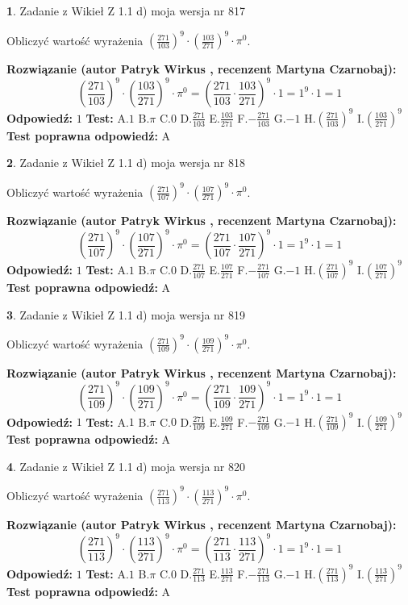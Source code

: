 \documentclass[12pt, a4paper]{article}
\theoremstyle{definition} %
\newtheorem{zad}{}
\newcommand{\zadStart}[1]{\begin{zad}#1\newline}
\newcommand{\zadStop}{\end{zad}}
\newcommand{\rozwStart}[2]{\noindent \textbf{Rozwiązanie (autor #1 , recenzent #2): }\newline}
\newcommand{\rozwStop}{\newline}
\newcommand{\odpStart}{\noindent \textbf{Odpowiedź:}\newline}
\newcommand{\odpStop}{\newline}
\newcommand{\testStart}{\noindent \textbf{Test:}\newline}
\newcommand{\testStop}{\newline}
\newcommand{\kluczStart}{\noindent \textbf{Test poprawna odpowiedź:}\newline}
\newcommand{\kluczStop}{\newline}
\begin{document}
\zadStart{Zadanie z Wikieł Z 1.1 d) moja wersja nr 817}

Obliczyć wartość wyrażenia $(\frac{271}{103})^{9} \cdot (\frac{103}{271})^{9} \cdot \pi^{0}$.
\zadStop
\rozwStart{Patryk Wirkus}{Martyna Czarnobaj}
$$(\frac{271}{103})^{9} \cdot (\frac{103}{271})^{9} \cdot \pi^{0} = (\frac{271}{103} \cdot \frac{103}{271})^{9} \cdot 1 = 1^{9} \cdot 1 = 1$$
\rozwStop
\odpStart
$1$
\odpStop
\testStart
A.$1$ B.$\pi$ C.$0$ D.$\frac{271}{103}$ E.$\frac{103}{271}$
F.$-\frac{271}{103}$ G.$-1$
H.$(\frac{271}{103})^{9}$
I.$(\frac{103}{271})^{9}$
\testStop
\kluczStart
A
\kluczStop



\zadStart{Zadanie z Wikieł Z 1.1 d) moja wersja nr 818}

Obliczyć wartość wyrażenia $(\frac{271}{107})^{9} \cdot (\frac{107}{271})^{9} \cdot \pi^{0}$.
\zadStop
\rozwStart{Patryk Wirkus}{Martyna Czarnobaj}
$$(\frac{271}{107})^{9} \cdot (\frac{107}{271})^{9} \cdot \pi^{0} = (\frac{271}{107} \cdot \frac{107}{271})^{9} \cdot 1 = 1^{9} \cdot 1 = 1$$
\rozwStop
\odpStart
$1$
\odpStop
\testStart
A.$1$ B.$\pi$ C.$0$ D.$\frac{271}{107}$ E.$\frac{107}{271}$
F.$-\frac{271}{107}$ G.$-1$
H.$(\frac{271}{107})^{9}$
I.$(\frac{107}{271})^{9}$
\testStop
\kluczStart
A
\kluczStop



\zadStart{Zadanie z Wikieł Z 1.1 d) moja wersja nr 819}

Obliczyć wartość wyrażenia $(\frac{271}{109})^{9} \cdot (\frac{109}{271})^{9} \cdot \pi^{0}$.
\zadStop
\rozwStart{Patryk Wirkus}{Martyna Czarnobaj}
$$(\frac{271}{109})^{9} \cdot (\frac{109}{271})^{9} \cdot \pi^{0} = (\frac{271}{109} \cdot \frac{109}{271})^{9} \cdot 1 = 1^{9} \cdot 1 = 1$$
\rozwStop
\odpStart
$1$
\odpStop
\testStart
A.$1$ B.$\pi$ C.$0$ D.$\frac{271}{109}$ E.$\frac{109}{271}$
F.$-\frac{271}{109}$ G.$-1$
H.$(\frac{271}{109})^{9}$
I.$(\frac{109}{271})^{9}$
\testStop
\kluczStart
A
\kluczStop



\zadStart{Zadanie z Wikieł Z 1.1 d) moja wersja nr 820}

Obliczyć wartość wyrażenia $(\frac{271}{113})^{9} \cdot (\frac{113}{271})^{9} \cdot \pi^{0}$.
\zadStop
\rozwStart{Patryk Wirkus}{Martyna Czarnobaj}
$$(\frac{271}{113})^{9} \cdot (\frac{113}{271})^{9} \cdot \pi^{0} = (\frac{271}{113} \cdot \frac{113}{271})^{9} \cdot 1 = 1^{9} \cdot 1 = 1$$
\rozwStop
\odpStart
$1$
\odpStop
\testStart
A.$1$ B.$\pi$ C.$0$ D.$\frac{271}{113}$ E.$\frac{113}{271}$
F.$-\frac{271}{113}$ G.$-1$
H.$(\frac{271}{113})^{9}$
I.$(\frac{113}{271})^{9}$
\testStop
\kluczStart
A
\kluczStop
\end{document}
